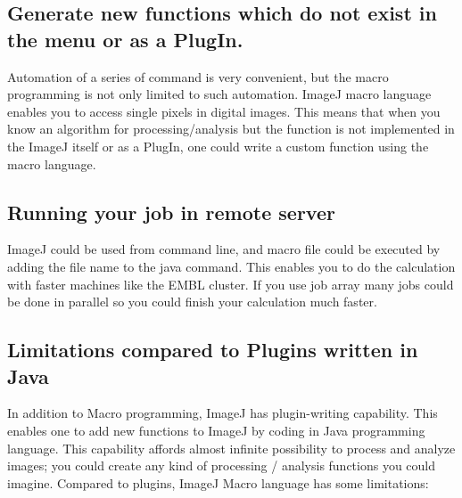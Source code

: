 \documentclass[11pt,a4paper,oneside]{report}
\begin{document}
\subsection{Generate new functions which do not exist in the menu or as a PlugIn.}
Automation of a series of command is very convenient, 
but the macro programming is not only limited to such automation. 
ImageJ macro language enables you to access single pixels in digital images. 
This means that when you know an algorithm for processing/analysis 
but the function is not implemented in the ImageJ 
itself or as a PlugIn, one could write a custom function using the macro language.
\subsection{Running your job in remote server}
ImageJ could be used from command line, and macro file could be executed by 
adding the file name to the java command. 
This enables you to do the calculation with faster machines like the EMBL cluster. 
If you use job array many jobs could be done in parallel so you could finish your calculation much faster.

\subsection{Limitations compared to Plugins written in Java}

In addition to Macro programming, ImageJ has plugin-writing capability.  This enables one to add new functions to ImageJ by coding in Java programming language. 
This capability affords almost infinite possibility to process and analyze images; 
you could create any kind of processing / analysis functions you could imagine. 
Compared to plugins, ImageJ Macro language has some limitations: 
\end{document}
